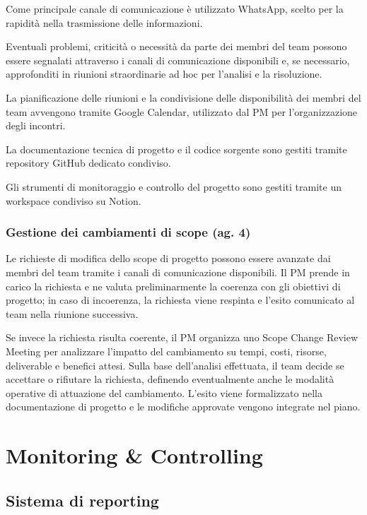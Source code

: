 \documentclass[11pt,a4paper]{article}
\begin{document}
{Come principale canale di comunicazione è utilizzato WhatsApp, scelto per la rapidità nella trasmissione delle informazioni.}

{Eventuali problemi, criticità o necessità da parte dei membri del team possono essere segnalati attraverso i canali di comunicazione disponibili e, se necessario, approfonditi in riunioni straordinarie ad hoc per l’analisi e la risoluzione.}

{La pianificazione delle riunioni e la condivisione delle disponibilità dei membri del team avvengono tramite Google Calendar, utilizzato dal PM per l’organizzazione degli incontri.}

{La documentazione tecnica di progetto e il codice sorgente sono gestiti tramite repository GitHub dedicato condiviso.}

{Gli strumenti di monitoraggio e controllo del progetto sono gestiti tramite un workspace condiviso su Notion.}

\subsubsection{\texorpdfstring{{Gestione dei cambiamenti di scope (ag. 4)}}{Gestione dei cambiamenti di scope (ag. 4)}}\label{h.erx0moktsty4}

{Le richieste di modifica dello scope di progetto possono essere avanzate dai membri del team tramite i canali di comunicazione disponibili. Il PM prende in carico la richiesta e ne valuta preliminarmente la coerenza con gli obiettivi di progetto; in caso di incoerenza, la richiesta viene respinta e l’esito comunicato al team nella riunione successiva.}

{Se invece la richiesta risulta coerente, il PM organizza uno Scope Change Review Meeting per analizzare l’impatto del cambiamento su tempi, costi, risorse, deliverable e benefici attesi. Sulla base dell’analisi effettuata, il team decide se accettare o rifiutare la richiesta, definendo eventualmente anche le modalità operative di attuazione del cambiamento. L’esito viene formalizzato nella documentazione di progetto e le modifiche approvate vengono integrate nel piano.}
\newpage

\section{\texorpdfstring{{Monitoring \& Controlling}}{Monitoring \& Controlling}}\label{h.bdipjqjhk4i0}

\subsection{\texorpdfstring{{Sistema di reporting}}{Sistema di reporting}}\label{h.y1ix5b8budcg}
\end{document}
